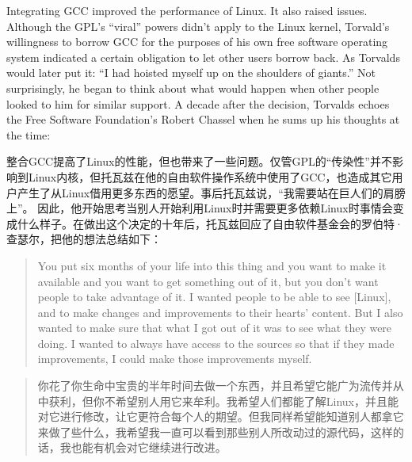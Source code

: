 \ifdefined\eng
Integrating GCC improved the performance of Linux. It also raised issues. Although the GPL's ``viral'' powers didn't apply to the Linux kernel, Torvald's willingness to borrow GCC for the purposes of his own free software operating system indicated a certain obligation to let other users borrow back. As Torvalds would later put it: ``I had hoisted myself up on the shoulders of giants.'' Not surprisingly, he began to think about what would happen when other people looked to him for similar support. A decade after the decision, Torvalds echoes the Free Software Foundation's Robert Chassel when he sums up his thoughts at the time:
\fi

\ifdefined\chs
整合GCC提高了Linux的性能，但也带来了一些问题。仅管GPL的``传染性''并不影响到Linux内核，但托瓦兹在他的自由软件操作系统中使用了GCC，也造成其它用户产生了从Linux借用更多东西的愿望。事后托瓦兹说，``我需要站在巨人们的肩膀上''。 因此，他开始思考当别人开始利用Linux时并需要更多依赖Linux时事情会变成什么样子。在做出这个决定的十年后，托瓦兹回应了自由软件基金会的罗伯特·查瑟尔，把他的想法总结如下：
\fi

\ifdefined\eng
\begin{quote}
You put six months of your life into this thing and you want to make it available and you want to get something out of it, but you don't want people to take advantage of it. I wanted people to be able to see [Linux], and to make changes and improvements to their hearts' content. But I also wanted to make sure that what I got out of it was to see what they were doing. I wanted to always have access to the sources so that if they made improvements, I could make those improvements myself.
\end{quote}
\fi

\ifdefined\chs
\begin{quote}
你花了你生命中宝贵的半年时间去做一个东西，并且希望它能广为流传并从中获利，但你不希望别人用它来牟利。我希望人们都能了解Linux，并且能对它进行修改，让它更符合每个人的期望。但我同样希望能知道别人都拿它来做了些什么，我希望我一直可以看到那些别人所改动过的源代码，这样的话，我也能有机会对它继续进行改进。
\end{quote}
\fi

